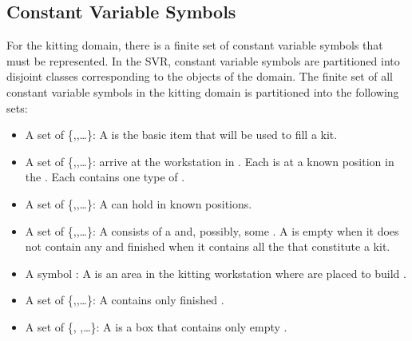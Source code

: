 \subsection{Constant Variable Symbols}
For the kitting domain, there is a finite set of constant variable symbols that must be represented. In the SVR, constant variable symbols are partitioned into disjoint classes corresponding to the objects of the domain. The finite set of all constant variable symbols in the kitting domain is partitioned into the following sets:
\begin{itemize}
\item A set of  \{,,\ldots\}: A  is the basic item that will be used to fill a kit.

\item A set of  \{,,\ldots\}:  arrive at the workstation in . Each  is at a known position in the . Each  contains one type of .

\item A set of  \{,,\ldots\}:  A  can hold  in known positions.

\item A set of  \{,,\ldots\}: A  consists of a  and, possibly, some . A  is empty when it does not contain any  and finished when it contains all the  that constitute a kit.

\item A symbol  : A  is an area in the kitting workstation where  are placed to build .

\item A set of  \{,,\ldots\}: A  contains only finished .

\item A set of  \{, ,\ldots\}: A  is a box that contains only empty .


\end{itemize}
